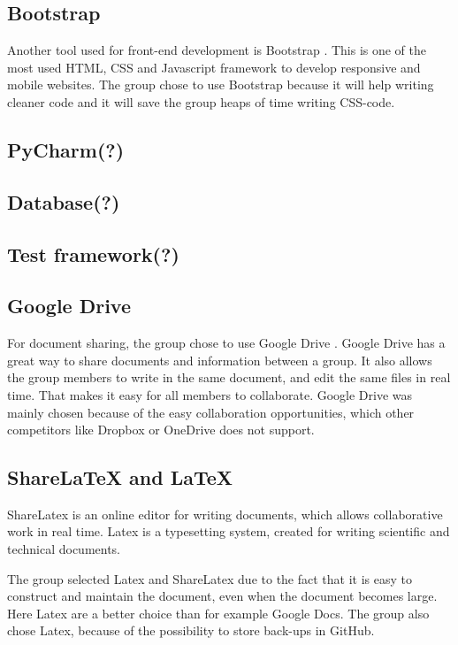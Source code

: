 \subsection{Bootstrap}
Another tool used for front-end development is Bootstrap \cite{Bootstrap}. This is one of the most used HTML, CSS and Javascript framework to develop responsive and mobile websites. The group chose to use Bootstrap because it will help writing cleaner code and it will save the group heaps of time writing CSS-code. 

\subsection{PyCharm(?)}
\subsection{Database(?)}
\subsection{Test framework(?)}

\subsection{Google Drive}
For document sharing, the group chose to use Google Drive \cite{GoogleDrive}. Google Drive has a great way to share documents and information between a group. It also allows the group members to write in the same document, and edit the same files in real time. That makes it easy for all members to collaborate. Google Drive was mainly chosen because of the easy collaboration opportunities, which other competitors like Dropbox or OneDrive does not support. 

\subsection{ShareLaTeX and LaTeX}
ShareLatex \cite{ShareLatex} is an online editor for writing documents, which allows collaborative work in real time. Latex is a typesetting system, created for writing scientific and technical documents.

The group selected Latex and ShareLatex due to the fact that it is easy to construct and maintain the document, even when the document becomes large. Here Latex are a better choice than for example Google Docs. The group also chose Latex, because of the possibility to store back-ups in GitHub.

